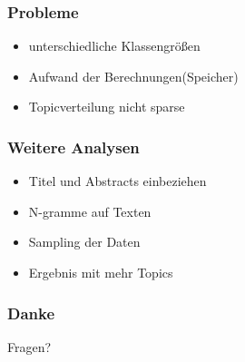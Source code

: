 \documentclass[12pt, xcolor=table]{beamer}
\begin{document}
\begin{frame}
    \frametitle{Probleme}
    \begin{itemize}
        \item unterschiedliche Klassengrößen
        \item Aufwand der Berechnungen(Speicher)
        \item Topicverteilung nicht sparse
    \end{itemize}
\end{frame}

\begin{frame}
    \frametitle{Weitere Analysen}
    \begin{itemize}
        \item Titel und Abstracts einbeziehen
        \item N-gramme auf Texten
        \item Sampling der Daten
        \item Ergebnis mit mehr Topics
    \end{itemize}
\end{frame}

\begin{frame}
    \frametitle{Danke}
    \begin{block}{Fragen?}
    \end{block}
\end{frame}
\end{document}
